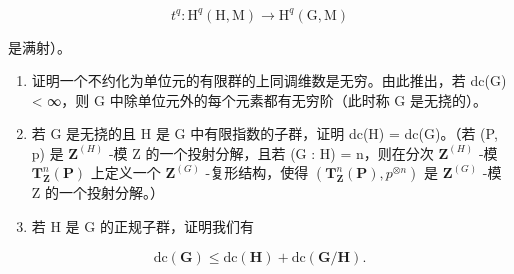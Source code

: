 \[
t ^ {q}: \mathrm{H} ^ {q} (\mathrm{H}, \mathrm{M}) \rightarrow \mathrm{H} ^ {q} (\mathrm{G}, \mathrm{M})
\]

是满射）。

\begin{enumerate}
\def\labelenumi{\alph{enumi})}
\setcounter{enumi}{3}
\item
  证明一个不约化为单位元的有限群的上同调维数是无穷。由此推出，若 dc(G) \textless{} ∞，则 G 中除单位元外的每个元素都有无穷阶（此时称 G 是无挠的）。
\item
  若 G 是无挠的且 H 是 G 中有限指数的子群，证明 dc(H) = dc(G)。（若 (P, p) 是 \(\mathbf{Z}^{(H)}\) -模 Z 的一个投射分解，且若 (G : H) = n，则在分次 \(\mathbf{Z}^{(H)}\) -模 \(\mathbf{T}_{\mathbf{Z}}^{n}(\mathbf{P})\) 上定义一个 \(\mathbf{Z}^{(G)}\) -复形结构，使得 \((\mathbf{T}_{\mathbf{Z}}^{n}(\mathbf{P}), p^{\otimes n})\) 是 \(\mathbf{Z}^{(G)}\) -模 Z 的一个投射分解。）
\item
  若 H 是 G 的正规子群，证明我们有
\end{enumerate}

\[
\mathrm{dc} (\mathbf {G}) \leqslant \mathrm{dc} (\mathbf {H}) + \mathrm{dc} (\mathbf {G} / \mathbf {H}).
\]

